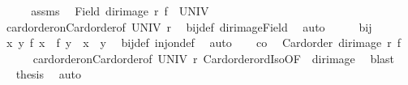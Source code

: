 \begin{isabellebody}
%
\isadelimproof
%
\endisadelimproof
%
\isatagproof
{}\isamarkupfalse%
\ {\isacharminus}{\kern0pt}\isanewline
\ \ \isamarkupfalse%
\ assms\ \isamarkupfalse%
\ {\isachardoublequoteopen}Field\ {\isacharparenleft}{\kern0pt}dir{\isacharunderscore}{\kern0pt}image\ r\ f{\isacharparenright}{\kern0pt}\ {\isacharequal}{\kern0pt}\ UNIV{\isachardoublequoteclose}\isanewline
\ \ \ \ \isamarkupfalse%
\ card{\isacharunderscore}{\kern0pt}order{\isacharunderscore}{\kern0pt}on{\isacharunderscore}{\kern0pt}Card{\isacharunderscore}{\kern0pt}order{\isacharbrackleft}{\kern0pt}of\ UNIV\ r{\isacharbrackright}{\kern0pt}\ \isamarkupfalse%
\ bij{\isacharunderscore}{\kern0pt}def\ dir{\isacharunderscore}{\kern0pt}image{\isacharunderscore}{\kern0pt}Field\ \isamarkupfalse%
\ auto\isanewline
\ \ \isamarkupfalse%
\ \isamarkupfalse%
\ bij\ \isamarkupfalse%
\ {\isachardoublequoteopen}{\isasymAnd}x\ y{\isachardot}{\kern0pt}\ {\isacharparenleft}{\kern0pt}f\ x\ {\isacharequal}{\kern0pt}\ f\ y{\isacharparenright}{\kern0pt}\ {\isacharequal}{\kern0pt}\ {\isacharparenleft}{\kern0pt}x\ {\isacharequal}{\kern0pt}\ y{\isacharparenright}{\kern0pt}{\isachardoublequoteclose}\ \isamarkupfalse%
\ bij{\isacharunderscore}{\kern0pt}def\ inj{\isacharunderscore}{\kern0pt}on{\isacharunderscore}{\kern0pt}def\ \isamarkupfalse%
\ auto\isanewline
\ \ \isamarkupfalse%
\ co\ \isamarkupfalse%
\ {\isachardoublequoteopen}Card{\isacharunderscore}{\kern0pt}order\ {\isacharparenleft}{\kern0pt}dir{\isacharunderscore}{\kern0pt}image\ r\ f{\isacharparenright}{\kern0pt}{\isachardoublequoteclose}\isanewline
\ \ \ \ \isamarkupfalse%
\ card{\isacharunderscore}{\kern0pt}order{\isacharunderscore}{\kern0pt}on{\isacharunderscore}{\kern0pt}Card{\isacharunderscore}{\kern0pt}order{\isacharbrackleft}{\kern0pt}of\ UNIV\ r{\isacharbrackright}{\kern0pt}\ Card{\isacharunderscore}{\kern0pt}order{\isacharunderscore}{\kern0pt}ordIso{}{\isacharbrackleft}{\kern0pt}OF\ {\isacharunderscore}{\kern0pt}\ dir{\isacharunderscore}{\kern0pt}image{\isacharbrackright}{\kern0pt}\ \isamarkupfalse%
\ blast\isanewline
\ \ \isamarkupfalse%
\ \isamarkupfalse%
\ {\isacharquery}{\kern0pt}thesis\ \isamarkupfalse%
\ auto\isanewline
{}\isamarkupfalse%
%
\endisatagproof
{\isafoldproof}%
%
\isadelimproof
\isanewline
%
\endisadelimproof

\end{isabellebody}
